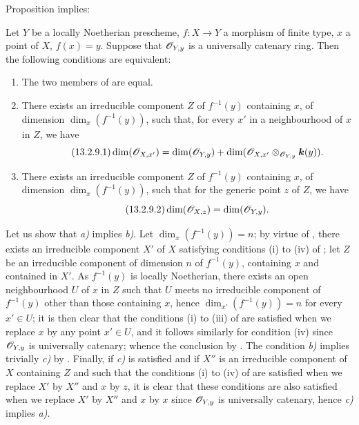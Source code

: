 Proposition  implies:

\begin{corollary}[13.2.9]
\label{IV.13.2.9}
Let $Y$ be a locally Noetherian prescheme, $f:X\to Y$ a morphism of finite type, $x$ a point of $X$, $f(x)=y$.
Suppose that $\mathscr{O}_{Y,y}$ is a universally catenary ring.
Then the following conditions are equivalent:
\begin{enumerate}[label=\emph{\alph*)}]
  \item The two members of  are equal.
  \item There exists an irreducible component $Z$ of $f^{-1}(y)$ containing $x$, of dimension $\dim_x(f^{-1}(y))$, such that, for every $x'$ in a neighbourhood of $x$ in $Z$, we have
  \[
  \label{IV.13.2.9.1}
\tag{13.2.9.1}
    \dim(\mathscr{O}_{X,x'})=\dim(\mathscr{O}_{Y,y})+\dim(\mathscr{O}_{X,x'}\otimes_{\mathscr{O}_{Y,y}}\boldsymbol{k}(y)).
  \]
  \item There exists an irreducible component $Z$ of $f^{-1}(y)$ containing $x$, of dimension $\dim_x(f^{-1}(y))$, such that for the generic point $z$ of $Z$, we have
  \[
  \label{IV.13.2.9.2}
\tag{13.2.9.2}
    \dim(\mathscr{O}_{X,z})=\dim(\mathscr{O}_{Y,y}).
  \]
\end{enumerate}
\end{corollary}

Let us show that \emph{a)} implies \emph{b)}.
Let $\dim_x(f^{-1}(y))=n$; by virtue of , there exists an irreducible component $X'$ of $X$ satisfying conditions (i) to (iv) of ; let $Z$ be an irreducible component of dimension $n$ of $f^{-1}(y)$, containing $x$ and contained in $X'$.
As $f^{-1}(y)$ is locally Noetherian, there exists an open neighbourhood $U$ of $x$ in $Z$ such that $U$ meets no irreducible component of $f^{-1}(y)$ other than those containing $x$, hence  $\dim_{x'}(f^{-1}(y))=n$ for every $x'\in U$; it is then clear that the conditions (i) to (iii) of  are satisfied when we replace $x$ by any point $x'\in U$, and it follows similarly for condition (iv) since $\mathscr{O}_{Y,y}$ is universally catenary; whence the conclusion by .
The condition \emph{b)} implies trivially \emph{c)} by .
Finally, if \emph{c)} is satisfied and if $X''$ is an irreducible component of $X$ containing $Z$ and such that the conditions (i) to (iv) of  are satisfied when we replace $X'$ by $X''$ and $x$ by $z$, it is clear that these conditions are also satisfied when we replace $X'$ by $X''$ and $x$ by $x$ since $\mathscr{O}_{Y,y}$ is universally catenary, hence \emph{c)} implies \emph{a)}.

